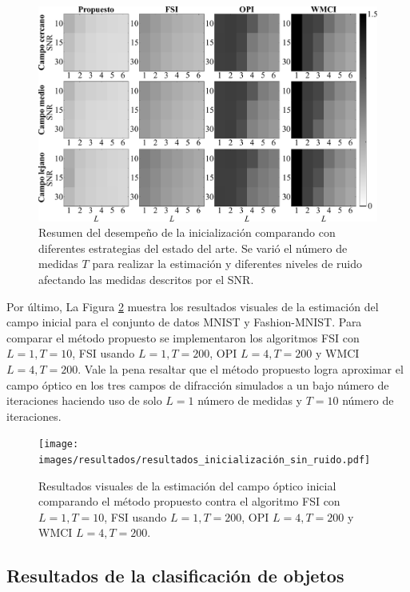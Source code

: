 \begin{figure}[h!]
         \includegraphics[width=1\linewidth]{images/resultados/Noisy_Initializations.pdf}
        \caption{Resumen del desempeño de la inicialización comparando con diferentes estrategias del estado del arte. Se varió el número de medidas $T$ para realizar la estimación y diferentes niveles de ruido afectando las medidas descritos por el SNR.}
        \label{fig:noisy_scenario}
\end{figure}

Por último, La Figura \ref{fig:resultados_inicialización_sin_ruido} muestra los resultados visuales de la estimación del campo inicial para el conjunto de datos MNIST y Fashion-MNIST. Para comparar el método propuesto se implementaron los algoritmos FSI con $L = 1, T = 10$, FSI usando $L = 1, T=200$, OPI $L = 4, T=200$ y WMCI $L = 4, T=200$. Vale la pena resaltar que el método propuesto logra aproximar el campo óptico en los tres campos de difracción simulados a un bajo número de iteraciones haciendo uso de solo $L=1$ número de medidas y $T=10$ número de iteraciones.

\begin{figure}[!h]
    \centering
    \texttt{[image: images/resultados/resultados\_inicialización\_sin\_ruido.pdf]}
    \caption{Resultados visuales de la estimación del campo óptico inicial comparando el método propuesto contra el algoritmo FSI con $L = 1, T = 10$, FSI usando $L = 1, T=200$, OPI $L = 4, T=200$ y WMCI $L = 4, T=200$.}
    \label{fig:resultados_inicialización_sin_ruido}
\end{figure}

\subsection{Resultados de la clasificación de objetos}

